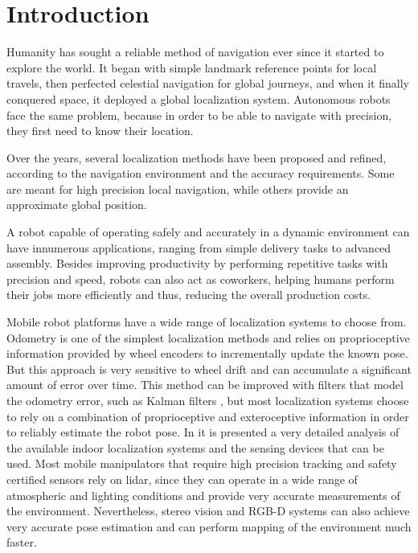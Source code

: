 \section{Introduction}\label{sec:introduction}

Humanity has sought a reliable method of navigation ever since it started to explore the world. It began with simple landmark reference points for local travels, then perfected celestial navigation for global journeys, and when it finally conquered space, it deployed a global localization system. Autonomous robots face the same problem, because in order to be able to navigate with precision, they first need to know their location.

Over the years, several localization methods have been proposed and refined, according to the navigation environment and the accuracy requirements. Some are meant for high precision local navigation, while others provide an approximate global position.

A robot capable of operating safely and accurately in a dynamic environment can have innumerous applications, ranging from simple delivery tasks to advanced assembly. Besides improving productivity by performing repetitive tasks with precision and speed, robots can also act as coworkers, helping humans perform their jobs more efficiently and thus, reducing the overall production costs.

Mobile robot platforms have a wide range of localization systems to choose from. Odometry is one of the simplest localization methods and relies on proprioceptive information provided by wheel encoders to incrementally update the known pose. But this approach is very sensitive to wheel drift and can accumulate a significant amount of error over time. This method can be improved with filters that model the odometry error, such as Kalman filters \cite{Wan2002}, but most localization systems choose to rely on a combination of proprioceptive and exteroceptive information in order to reliably estimate the robot pose. In \cite{Mautz2012} it is presented a very detailed analysis of the available indoor localization systems and the sensing devices that can be used. Most mobile manipulators that require high precision tracking and safety certified sensors rely on \gls{lidar}, since they can operate in a wide range of atmospheric and lighting conditions and provide very accurate measurements of the environment. Nevertheless, stereo vision and RGB-D systems can also achieve very accurate pose estimation and can perform mapping of the environment much faster.

